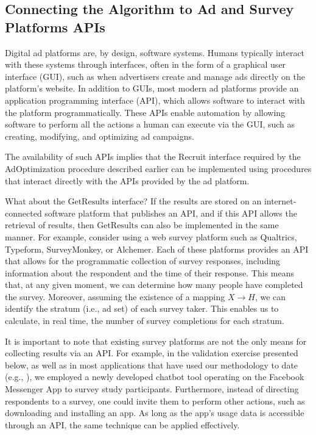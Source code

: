 \documentclass[letterpaper,12pt]{article}
\theoremstyle{proposition}
\begin{document}
\subsection*{Connecting the Algorithm to Ad and Survey Platforms APIs}

Digital ad platforms are, by design, software systems. Humans typically interact with these systems through interfaces, often in the form of a graphical user interface (GUI), such as when advertisers create and manage ads directly on the platform's website. In addition to GUIs, most modern ad platforms provide an application programming interface (API), which allows software to interact with the platform programmatically. These APIs enable automation by allowing software to perform all the actions a human can execute via the GUI, such as creating, modifying, and optimizing ad campaigns.


The availability of such APIs implies that the Recruit interface required by the AdOptimization procedure described earlier can be implemented using procedures that interact directly with the APIs provided by the ad platform.

What about the \(\text{GetResults}\) interface? If the results are stored on an internet-connected software platform that publishes an API, and if this API allows the retrieval of results, then \(\text{GetResults}\) can also be implemented in the same manner. For example, consider using a web survey platform such as Qualtrics, Typeform, SurveyMonkey, or Alchemer. Each of these platforms provides an API that allows for the programmatic collection of survey responses, including information about the respondent and the time of their response. This means that, at any given moment, we can determine how many people have completed the survey. Moreover, assuming the existence of a mapping \( X \rightarrow H \), we can identify the stratum (i.e., ad set) of each survey taker. This enables us to calculate, in real time, the number of survey completions for each stratum.

It is important to note that existing survey platforms are not the only means for collecting results via an API.
For example, in the validation exercise presented below, as well as in most applications that have used our methodology to date 
(e.g., \citealt{donati2024can, donati2022marketing,  ichimiya2023evaluation, evans2023outcomes, agha2021drivers}), we employed a newly developed chatbot tool operating on the Facebook Messenger App to survey study participants. Furthermore, instead of directing respondents to a survey, one could invite them to perform other actions, such as downloading and installing an app. As long as the app's usage data is accessible through an API, the same technique can be applied effectively.
\end{document}
